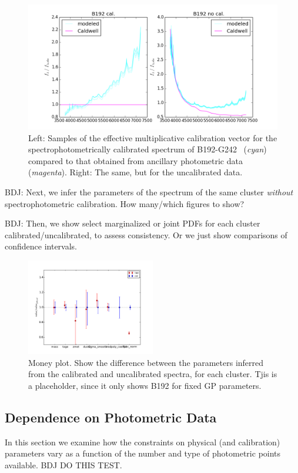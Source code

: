 \documentclass[iop,numberedappendix]{emulateapj}
\newcommand{\excluster}{B192-G242}
\begin{document}
\begin{figure}[h!]
\includegraphics[width=\textwidth]{figures/cfig_b192-g242_020.png}
\caption{Left: Samples of the effective multiplicative calibration
  vector for the spectrophotometrically calibrated spectrum of
  \excluster~ ({\it cyan}) compared to that obtained from ancillary
  photometric data ({\it magenta}).  Right:  The same, but for the
  uncalibrated data. 
 \label{fig:inferred_calib}}
\end{figure}

BDJ: Next, we infer the parameters of the spectrum of the same cluster
\emph{without} spectrophotometric calibration.  How many/which figures
to show?

BDJ: Then, we show select marginalized or joint PDFs for each cluster
calibrated/uncalibrated, to assess consistency.  Or we just show
comparisons of confidence intervals.

\begin{figure}[h!]
\includegraphics[width =0.5\textwidth]{figures/B192_020_cratio.pdf}
\caption{Money plot.  Show the difference between the parameters
  inferred from the calibrated and uncalibrated spectra, for each
  cluster. Tjis is a placeholder, since it only shows B192 for fixed
  GP parameters. \label{fig:boom}}
\end{figure}

\subsection{Dependence on Photometric Data}
In this section we examine how the constraints on physical (and
calibration) parameters vary as a function of the number and type of
photometric points available. {\color{red} BDJ DO THIS TEST.}
\end{document}
